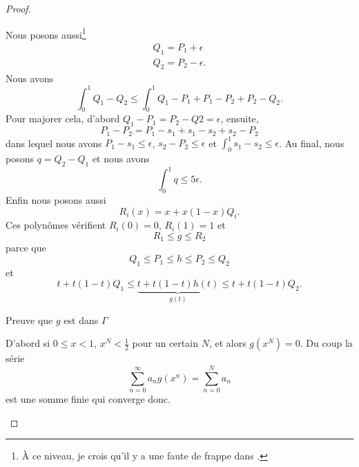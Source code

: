 \begin{proof}
\begin{subproof}
        Nous posons aussi\footnote{À ce niveau, je crois qu'il y a une faute de frappe dans \cite{ytMOpe}.}
        \begin{subequations}
            \begin{align}
                Q_1=P_1+\epsilon\\
                Q_2=P_2-\epsilon.
            \end{align}
        \end{subequations}
        Nous avons
        \begin{equation}
            \int_0^1Q_1-Q_2\leq\int_0^1 Q_1-P_1+P_1-P_2+P_2-Q_2.
        \end{equation}
        Pour majorer cela, d'abord \( Q_1-P_1=P_2-Q2=\epsilon\), ensuite,
        \begin{equation}
            P_1-P_2=P_1-s_1+s_1-s_2+s_2-P_2
        \end{equation}
        dans lequel nous avons \( P_1-s_1\leq \epsilon\), \( s_2-P_2\leq \epsilon\) et \( \int_0^1s_1-s_2\leq\epsilon\). Au final, nous posons \( q=Q_2-Q_1\) et nous avons
        \begin{equation}
            \int_0^1q\leq 5\epsilon.
        \end{equation}
        Enfin nous posons aussi
        \begin{equation}
            R_i(x)=x+x(1-x)Q_i.
        \end{equation}
        Ces polynômes vérifient \( R_i(0)=0\), \( R_i(1)=1\) et
        \begin{equation}
            R_1\leq g\leq R_2
        \end{equation}
        parce que
        \begin{equation}
            Q_1\leq P_1\leq h\leq  P_2\leq Q_2
        \end{equation}
        et
        \begin{equation}
            t+t(1-t)Q_1\leq \underbrace{t+t(1-t)h(t)}_{g(t)}\leq t+t(1-t)Q_2.
        \end{equation}

    \item[Preuve que \( g\) est dans \( \Gamma\)]

        D'abord si \( 0\leq x<1\), \( x^N<\frac{ 1 }{2}\) pour un certain \( N\), et alors \( g(x^N)=0\). Du coup la série
        \begin{equation}
            \sum_{n=0}^{\infty}a_ng(x^n)=\sum_{n=0}^{N}a_n
        \end{equation}
        est une somme finie qui converge donc.


\end{subproof}
\end{proof}

